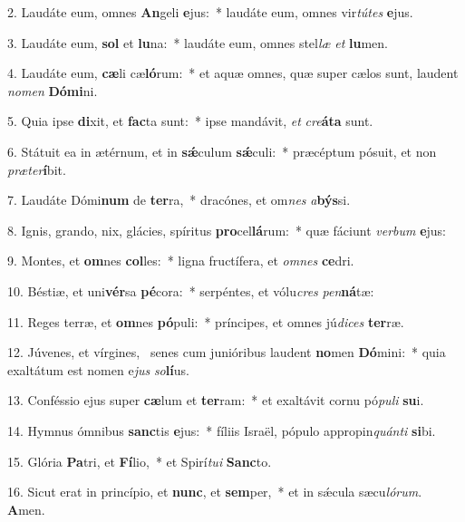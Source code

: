 2. Laudáte eum, omnes \textbf{An}geli \textbf{e}jus:~*  laudáte eum, omnes vir\textit{tú}\textit{tes} \textbf{e}jus.\

3. Laudáte eum, \textbf{sol} et \textbf{lu}na:~*  laudáte eum, omnes stel\textit{læ} \textit{et} \textbf{lu}men.\

4. Laudáte eum, \textbf{cæ}li cæ\textbf{ló}rum:~*  et aquæ omnes, quæ super cælos sunt, laudent \textit{no}\textit{men} \textbf{Dó}\textbf{mi}ni.\

5. Quia ipse \textbf{di}xit, et \textbf{fac}ta sunt:~*  ipse mandávit, \textit{et} \textit{cre}\textbf{á}\textbf{ta} sunt.\

6. Státuit ea in ætérnum, et in \textbf{sǽ}culum \textbf{sǽ}culi:~*  præcéptum pósuit, et non \textit{præ}\textit{ter}\textbf{í}bit.\

7. Laudáte Dómi\textbf{num} de \textbf{ter}ra,~*  dracónes, et om\textit{nes} \textit{a}\textbf{býs}si.\

8. Ignis, grando, nix, glácies, spíritus \textbf{pro}cel\textbf{lá}rum:~*  quæ fáciunt \textit{ver}\textit{bum} \textbf{e}jus:\

9. Montes, et \textbf{om}nes \textbf{col}les:~*  ligna fructífera, et \textit{om}\textit{nes} \textbf{ce}dri.\

10. Béstiæ, et uni\textbf{vér}sa \textbf{pé}cora:~*  serpéntes, et vólu\textit{cres} \textit{pen}\textbf{ná}tæ:\

11. Reges terræ, et \textbf{om}nes \textbf{pó}puli:~*  príncipes, et omnes jú\textit{di}\textit{ces} \textbf{ter}ræ.\

12. Júvenes, et vírgines, \dag\  senes cum junióribus laudent \textbf{no}men \textbf{Dó}mini:~*  quia exaltátum est nomen e\textit{jus} \textit{so}\textbf{lí}us.\

13. Conféssio ejus super \textbf{cæ}lum et \textbf{ter}ram:~*  et exaltávit cornu pó\textit{pu}\textit{li} \textbf{su}i.\

14. Hymnus ómnibus \textbf{sanc}tis \textbf{e}jus:~*  fíliis Israël, pópulo appropin\textit{quán}\textit{ti} \textbf{si}bi.\

15. Glória \textbf{Pa}tri, et \textbf{Fí}lio,~*  et Spirí\textit{tu}\textit{i} \textbf{Sanc}to.\

16. Sicut erat in princípio, et \textbf{nunc}, et \textbf{sem}per,~*  et in sǽcula sæcu\textit{ló}\textit{rum}. \textbf{A}men.\

